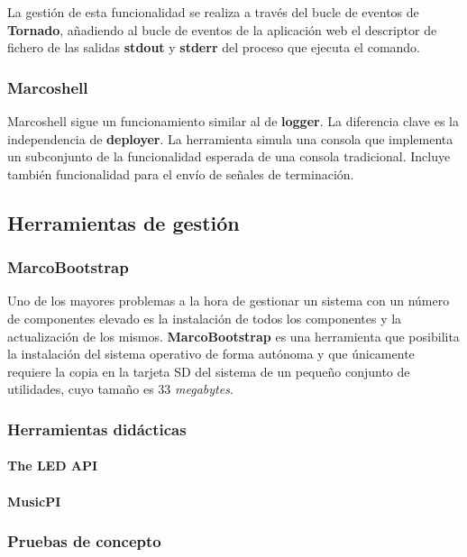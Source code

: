 La gestión de esta funcionalidad se realiza a través del bucle de eventos de \textbf{Tornado}, añadiendo al bucle de eventos de la aplicación web el descriptor de fichero de las salidas \textbf{stdout} y \textbf{stderr} del proceso que ejecuta el comando.

\subsubsection{Marcoshell}

Marcoshell sigue un funcionamiento similar al de \textbf{logger}. La diferencia clave es la independencia de \textbf{deployer}. La herramienta simula una consola que implementa un subconjunto de la funcionalidad esperada de una consola tradicional. Incluye también funcionalidad para el envío de señales de terminación.

\subsection{Herramientas de gestión}

\subsubsection{MarcoBootstrap}

Uno de los mayores problemas a la hora de gestionar un sistema con un número de componentes elevado es la instalación de todos los componentes y la actualización de los mismos. \textbf{MarcoBootstrap} es una herramienta que posibilita la instalación del sistema operativo de forma autónoma y que únicamente requiere la copia en la tarjeta SD del sistema de un pequeño conjunto de utilidades, cuyo tamaño es 33 \textit{megabytes}.


\subsubsection{Herramientas didácticas}

\paragraph{The LED API}

\paragraph{MusicPI}


\subsubsection{Pruebas de concepto}


